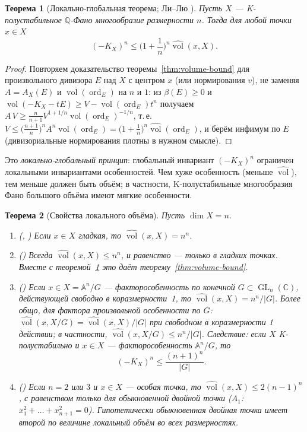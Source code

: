 \documentclass[11pt,a4paper]{article}
\theoremstyle{plain}
\newtheorem{theorem}{Теорема}[section]
\theoremstyle{definition}
\theoremstyle{remark}
\renewcommand{\C}{\mathbb{C}}
\newcommand{\Q}{\mathbb{Q}}
\newcommand{\A}{\mathbb{A}}
\DeclareMathOperator{\ord}{ord}
\DeclareMathOperator{\GL}{GL}
\DeclareMathOperator{\vol}{vol}
\newcommand{\hvol}{\widehat{\vol}}
\begin{document}
\begin{theorem}[{Локально-глобальная теорема; Ли--Лю \cite{LL19}}]\label{thm:local-global}
Пусть $X$ --- K-полустабильное $\Q$-Фано многообразие размерности $n$. Тогда для любой точки
$x\in X$
\[
(-K_X)^n\le\Big(1+\frac1n\Big)^n\hvol(x,X) .
\]
\end{theorem}
\begin{proof}
Повторяем доказательство теоремы~\ref{thm:volume-bound} для произвольного дивизора $E$ над $X$ с
центром $x$ (или нормирования $v$), не заменяя $A=A_X(E)$ и $\vol(\ord_E)$ на $n$ и $1$:
из $\beta(E)\ge0$ и $\vol(-K_X-tE)\ge V-\vol(\ord_E)t^n$ получаем
$A\,V\ge\frac n{n+1}V^{1+1/n}\vol(\ord_E)^{-1/n}$, т.\,е. $V\le\big(\frac{n+1}n\big)^nA^n\vol(\ord_E)=\big(1+\frac1n\big)^n\hvol(\ord_E)$,
и берём инфимум по $E$ (дивизориальные нормирования плотны в нужном смысле).
\end{proof}

Это \emph{локально-глобальный принцип}: глобальный инвариант $(-K_X)^n$ ограничен локальными
инвариантами особенностей. Чем хуже особенность (меньше $\hvol$), тем меньше должен быть объём; в
частности, K-полустабильные многообразия Фано большого объёма имеют мягкие особенности.

\begin{theorem}[{Свойства локального объёма}]\label{thm:nvol-properties}
Пусть $\dim X=n$.
\begin{enumerate}
\item (\cite{dFEM}, \cite{Li18}) Если $x\in X$ гладкая, то $\hvol(x,X)=n^n$.
\item (\cite{LX19}) Всегда $\hvol(x,X)\le n^n$, и равенство --- только в гладких точках. Вместе с
теоремой~\ref{thm:local-global} это даёт теорему~\ref{thm:volume-bound}.
\item (\cite{Liu18}) Если $x\in X=\A^n/G$ --- факторособенность по конечной $G\subset\GL_n(\C)$,
действующей свободно в коразмерности~1, то $\hvol(x,X)=n^n/|G|$. Более общо, для фактора
произвольной особенности по $G$: $\hvol(x,X/G)=\hvol(x,X)/|G|$ при свободном в коразмерности 1
действии; в частности, $\hvol(x,X/G)\le n^n/|G|$. Следствие: \emph{если $X$ K-полустабильно и
$x\in X$ --- факторособенность $\A^n/G$, то}
\begin{equation}\label{eq:quotient-bound}
(-K_X)^n\le\frac{(n+1)^n}{|G|} .
\end{equation}
\item (\cite{LX19}) Если $n=2$ или $3$ и $x\in X$ --- особая точка, то $\hvol(x,X)\le2(n-1)^n$,
с равенством только для обыкновенной двойной точки ($A_1$: $x_1^2+\dots+x_{n+1}^2=0$).
Гипотетически обыкновенная двойная точка имеет второй по величине локальный объём во всех
размерностях.
\end{enumerate}
\end{theorem}
\end{document}
